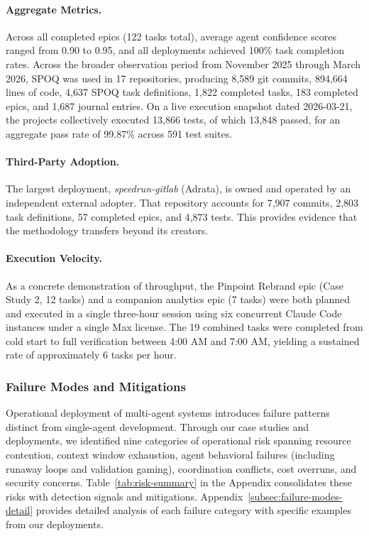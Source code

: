 \paragraph{Aggregate Metrics.}
Across all completed epics (122 tasks total), average agent confidence
scores ranged from 0.90 to 0.95, and all deployments achieved 100\%
task completion rates. Across the broader observation period from
November 2025 through March 2026, SPOQ was used in 17 repositories,
producing 8{,}589 git commits, 894{,}664 lines of code, 4{,}637 SPOQ
task definitions, 1{,}822 completed tasks, 183 completed epics, and
1{,}687 journal entries. On a live execution snapshot dated 2026-03-21,
the projects collectively executed 13{,}866 tests, of which 13{,}848
passed, for an aggregate pass rate of 99.87\% across 591 test suites.

\paragraph{Third-Party Adoption.}
The largest deployment, \textit{speedrun-gitlab} (Adrata), is owned and operated by an independent external adopter. That repository accounts for 7{,}907 commits, 2{,}803 task definitions, 57 completed epics, and 4{,}873 tests. This provides evidence that the methodology transfers beyond its creators.

\paragraph{Execution Velocity.}
As a concrete demonstration of throughput, the Pinpoint Rebrand epic
(Case Study 2, 12 tasks) and a companion analytics epic (7 tasks) were
both planned and executed in a single three-hour session using six
concurrent Claude Code instances under a single Max license. The 19
combined tasks were completed from cold start to full verification
between 4:00 AM and 7:00 AM, yielding a sustained rate of approximately
6 tasks per hour.

\subsubsection{Failure Modes and Mitigations}
\label{subsec:failure-modes}

Operational deployment of multi-agent systems introduces failure patterns
distinct from single-agent development. Through our case studies and
deployments, we identified nine categories of operational risk spanning
resource contention, context window exhaustion, agent behavioral failures
(including runaway loops and validation gaming), coordination conflicts,
cost overruns, and security concerns. Table~\ref{tab:risk-summary} in
the Appendix consolidates these risks with detection signals and mitigations.
Appendix~\ref{subsec:failure-modes-detail} provides detailed analysis of each
failure category with specific examples from our deployments.

